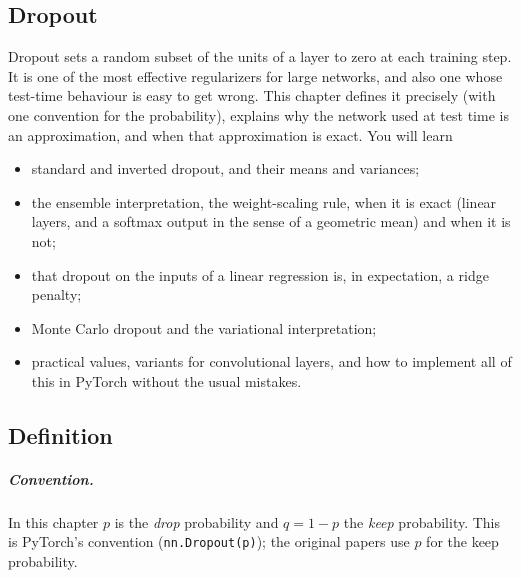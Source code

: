\begin{notechapter}
\chapter{Dropout}\label{ch:dropout}

\begin{chapterintro}
Dropout sets a random subset of the units of a layer to zero at each training step. It is
one of the most effective regularizers for large networks, and also one whose test-time
behaviour is easy to get wrong. This chapter defines it precisely (with one convention for
the probability), explains why the network used at test time is an approximation, and
when that approximation is exact. You will learn
\begin{itemize}[nosep]
  \item standard and inverted dropout, and their means and variances;
  \item the ensemble interpretation, the weight-scaling rule, when it is exact (linear
        layers, and a softmax output in the sense of a geometric mean) and when it is not;
  \item that dropout on the inputs of a linear regression is, in expectation, a ridge penalty;
  \item Monte Carlo dropout and the variational interpretation;
  \item practical values, variants for convolutional layers, and how to implement all of this
        in PyTorch without the usual mistakes.
\end{itemize}
\end{chapterintro}

\section{Definition}\label{dropout:sec:definition}

\paragraph{Convention.} In this chapter $p$ is the \emph{drop} probability and $q = 1 - p$ the \emph{keep}
probability. This is PyTorch's convention (\texttt{nn.Dropout(p)}); the original papers use $p$
for the keep probability.


\end{notechapter}
